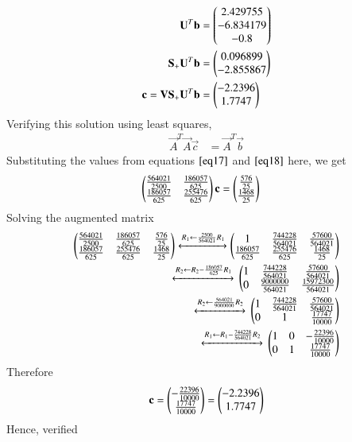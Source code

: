 \documentclass[journal,12pt,twocolumn]{IEEEtran}
\begin{document}
\begin{align}
    \mathbf{U}^T\mathbf{b} &= \begin{pmatrix}2.429755\\-6.834179\\-0.8\end{pmatrix}\\
    \mathbf{S}_+\mathbf{U}^T\mathbf{b} &= \begin{pmatrix}0.096899\\-2.855867\end{pmatrix}\\
    \mathbf{c} = \mathbf{V}\mathbf{S}_+\mathbf{U}^T\mathbf{b} &= \begin{pmatrix}-2.2396\\1.7747\end{pmatrix}
\end{align}
Verifying this solution using least squares,
\begin{align}
    \vec{A}^T\vec{A}\vec{c} &= \vec{A}^T\vec{b}
\end{align}
Substituting the values from equations $\eqref{eq17}$ and $\eqref{eq18}$ here, we get
\begin{align}
    \begin{pmatrix}\frac{564021}{2500}&\frac{186057}{625}\\\frac{186057}{625}&\frac{255476}{625}\end{pmatrix}\mathbf{c} &= \begin{pmatrix}\frac{576}{25}\\\frac{1468}{25}\end{pmatrix}
\end{align}
Solving the augmented matrix
\begin{align}
    \begin{pmatrix}\frac{564021}{2500}&\frac{186057}{625}&\frac{576}{25}\\\frac{186057}{625}&\frac{255476}{625}&\frac{1468}{25}\end{pmatrix}\xleftrightarrow[]{R_1\leftarrow \frac{2500}{564021}R_1}\begin{pmatrix}1&\frac{744228}{564021}&\frac{57600}{564021}\\\frac{186057}{625}&\frac{255476}{625}&\frac{1468}{25}\end{pmatrix}\\
    \xleftrightarrow[]{R_2\leftarrow R_2-\frac{186057}{625}R_1}{}\begin{pmatrix}1&\frac{744228}{564021}&\frac{57600}{564021}\\0&\frac{9000000}{564021}&\frac{15972300}{564021}\end{pmatrix}\\
    \xleftrightarrow[]{R_2\leftarrow \frac{564021}{9000000}R_2}{}\begin{pmatrix}1&\frac{744228}{564021}&\frac{57600}{564021}\\0&1&\frac{17747}{10000}\end{pmatrix}\\
    \xleftrightarrow[]{R_1\leftarrow R_1-\frac{744228}{564021}R_2}{}\begin{pmatrix}1&0&-\frac{22396}{10000} \\0&1&\frac{17747}{10000}\end{pmatrix}
\end{align}
Therefore
\begin{align}
    \mathbf{c} = \begin{pmatrix}-\frac{22396}{10000}\\\frac{17747}{10000}\end{pmatrix}=\begin{pmatrix}-2.2396\\1.7747\end{pmatrix}
\end{align}
Hence, verified
\end{document}
